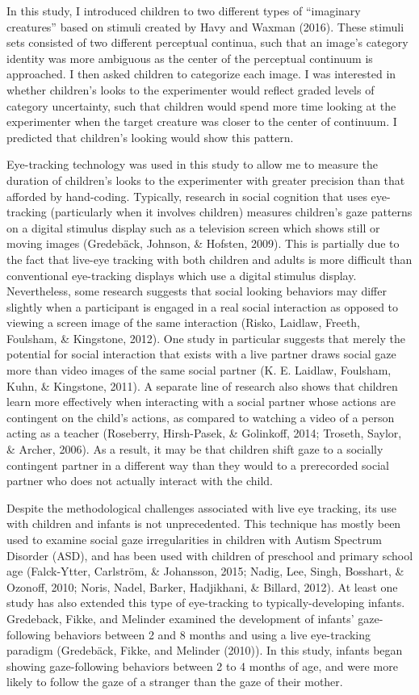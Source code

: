 \documentclass[floatsintext,man]{apa6}
\theoremstyle{definition}
\theoremstyle{definition}
\theoremstyle{definition}
\theoremstyle{remark}
\begin{document}
In this study, I introduced children to two different types of
\enquote{imaginary creatures} based on stimuli created by Havy and
Waxman (2016). These stimuli sets consisted of two different perceptual
continua, such that an image's category identity was more ambiguous as
the center of the perceptual continuum is approached. I then asked
children to categorize each image. I was interested in whether
children's looks to the experimenter would reflect graded levels of
category uncertainty, such that children would spend more time looking
at the experimenter when the target creature was closer to the center of
continuum. I predicted that children's looking would show this pattern.

Eye-tracking technology was used in this study to allow me to measure
the duration of children's looks to the experimenter with greater
precision than that afforded by hand-coding. Typically, research in
social cognition that uses eye-tracking (particularly when it involves
children) measures children's gaze patterns on a digital stimulus
display such as a television screen which shows still or moving images
(Gredebäck, Johnson, \& Hofsten, 2009). This is partially due to the
fact that live-eye tracking with both children and adults is more
difficult than conventional eye-tracking displays which use a digital
stimulus display. Nevertheless, some research suggests that social
looking behaviors may differ slightly when a participant is engaged in a
real social interaction as opposed to viewing a screen image of the same
interaction (Risko, Laidlaw, Freeth, Foulsham, \& Kingstone, 2012). One
study in particular suggests that merely the potential for social
interaction that exists with a live partner draws social gaze more than
video images of the same social partner (K. E. Laidlaw, Foulsham, Kuhn,
\& Kingstone, 2011). A separate line of research also shows that
children learn more effectively when interacting with a social partner
whose actions are contingent on the child's actions, as compared to
watching a video of a person acting as a teacher (Roseberry,
Hirsh-Pasek, \& Golinkoff, 2014; Troseth, Saylor, \& Archer, 2006). As a
result, it may be that children shift gaze to a socially contingent
partner in a different way than they would to a prerecorded social
partner who does not actually interact with the child.

Despite the methodological challenges associated with live eye tracking,
its use with children and infants is not unprecedented. This technique
has mostly been used to examine social gaze irregularities in children
with Autism Spectrum Disorder (ASD), and has been used with children of
preschool and primary school age (Falck-Ytter, Carlström, \& Johansson,
2015; Nadig, Lee, Singh, Bosshart, \& Ozonoff, 2010; Noris, Nadel,
Barker, Hadjikhani, \& Billard, 2012). At least one study has also
extended this type of eye-tracking to typically-developing infants.
Gredeback, Fikke, and Melinder examined the development of infants'
gaze-following behaviors between 2 and 8 months and using a live
eye-tracking paradigm (Gredebäck, Fikke, and Melinder (2010)). In this
study, infants began showing gaze-following behaviors between 2 to 4
months of age, and were more likely to follow the gaze of a stranger
than the gaze of their mother.
\end{document}
